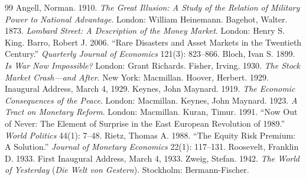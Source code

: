 \documentclass[11pt]{article}
\begin{document}
\begin{thebibliography}{99}
 Angell, Norman. 1910. \emph{The Great Illusion: A Study of the Relation of
Military Power to National Advantage}. London: William Heinemann.
 Bagehot, Walter. 1873. \emph{Lombard Street: A Description of the Money
Market}. London: Henry S. King.
 Barro, Robert J. 2006. ``Rare Disasters and Asset Markets in the Twentieth
Century.'' \emph{Quarterly Journal of Economics} 121(3): 823--866.
 Bloch, Ivan S. 1899. \emph{Is War Now Impossible?} London: Grant Richards.
 Fisher, Irving. 1930. \emph{The Stock Market Crash---and After}. New York:
Macmillan.
 Hoover, Herbert. 1929. Inaugural Address, March 4, 1929.
 Keynes, John Maynard. 1919. \emph{The Economic Consequences of the Peace}.
London: Macmillan.
 Keynes, John Maynard. 1923. \emph{A Tract on Monetary Reform}. London:
Macmillan.
 Kuran, Timur. 1991. ``Now Out of Never: The Element of Surprise in the East
European Revolution of 1989.'' \emph{World Politics} 44(1): 7--48.
 Rietz, Thomas A. 1988. ``The Equity Risk Premium: A Solution.''
\emph{Journal of Monetary Economics} 22(1): 117--131.
 Roosevelt, Franklin D. 1933. First Inaugural Address, March 4, 1933.
 Zweig, Stefan. 1942. \emph{The World of Yesterday} (\emph{Die Welt von
Gestern}). Stockholm: Bermann-Fischer.
\end{thebibliography}
\end{document}
